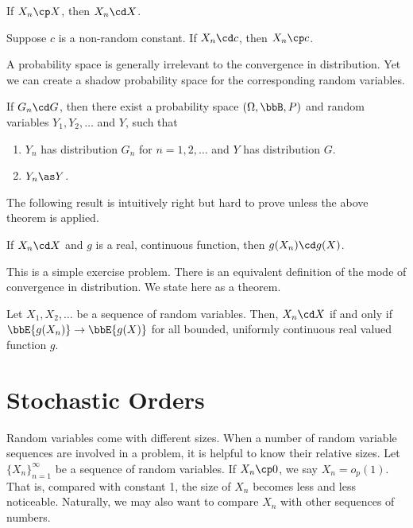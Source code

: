 \begin{theorem}
If $X_n \cp X$, then $X_n \cd X$.

Suppose $c$ is a non-random constant.
If $X_n \cd c$, then $X_n \cp c$.
\end{theorem}

A probability space is generally irrelevant to
the convergence in distribution. Yet 
we can create a shadow probability space
for the corresponding random variables.

\begin{theorem}
{\label{Skorokhod}}
If $G_n \cd G$, then there exist a probability space $(\Omega, \bbB, P)$ 
and random variables $Y_1, Y_2, \ldots$ and $Y$, such that
\begin{enumerate}
\item 
$Y_n$ has distribution $G_n$ for $n=1, 2, \ldots$ and $Y$ has distribution $G$.

\item 
$Y_n \as Y$.
\end{enumerate}
\end{theorem}

The following result is intuitively right
but hard to prove unless the above theorem is applied.

\begin{example}
If $X_n \cd X$ and $g$ is a real, continuous function, then $g(X_n) \cd g(X)$.
\end{example}
\noindent

This is a simple exercise problem.
There is an equivalent definition of the mode of convergence in
distribution. We state here as a theorem.

\begin{theorem}
Let $X_1, X_2, \ldots$ be a sequence of random variables.
Then, $X_n \cd X$ if and only if $\bbE \{ g(X_n)\} \to \bbE \{g(X)\}$ 
for all bounded, uniformly continuous real valued function $g$.
\end{theorem}

\section{Stochastic Orders}
Random variables come with different sizes. When 
a number of random variable sequences are involved in
a problem, it is helpful to know their relative sizes. 
Let $\{X_n\}_{n=1}^\infty$ be a sequence of random variables. 
If $X_n \cp 0$, we say $X_n = o_p(1)$.
That is, compared with constant 1, the size of $X_n$ becomes
less and less noticeable. Naturally, we may also want to compare $X_n$
with other sequences of numbers. 

